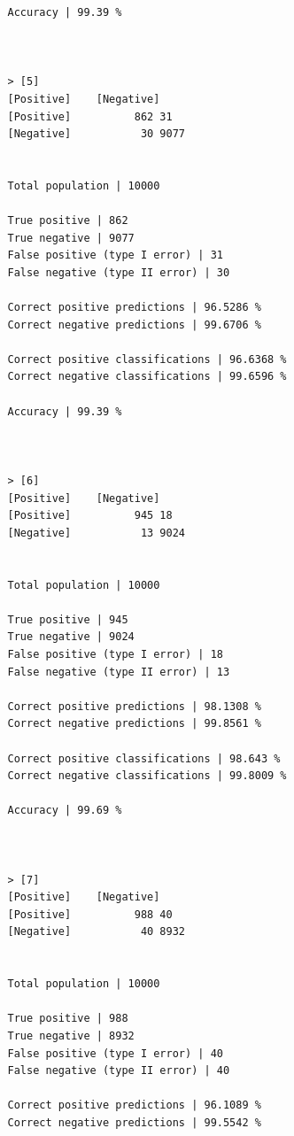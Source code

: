 \documentclass{classrep}
\begin{document}
{{{\begin{lstlisting}
                Accuracy | 99.39 %



                > [5]
                [Positive]    [Negative]
                [Positive]          862 31
                [Negative]           30 9077


                Total population | 10000

                True positive | 862
                True negative | 9077
                False positive (type I error) | 31
                False negative (type II error) | 30

                Correct positive predictions | 96.5286 %
                Correct negative predictions | 99.6706 %

                Correct positive classifications | 96.6368 %
                Correct negative classifications | 99.6596 %

                Accuracy | 99.39 %



                > [6]
                [Positive]    [Negative]
                [Positive]          945 18
                [Negative]           13 9024


                Total population | 10000

                True positive | 945
                True negative | 9024
                False positive (type I error) | 18
                False negative (type II error) | 13

                Correct positive predictions | 98.1308 %
                Correct negative predictions | 99.8561 %

                Correct positive classifications | 98.643 %
                Correct negative classifications | 99.8009 %

                Accuracy | 99.69 %



                > [7]
                [Positive]    [Negative]
                [Positive]          988 40
                [Negative]           40 8932


                Total population | 10000

                True positive | 988
                True negative | 8932
                False positive (type I error) | 40
                False negative (type II error) | 40

                Correct positive predictions | 96.1089 %
                Correct negative predictions | 99.5542 %


\end{lstlisting}}}}
\end{document}
